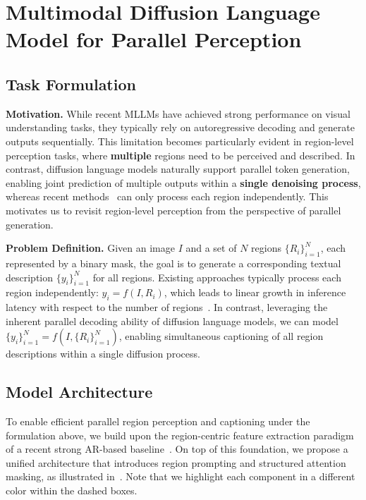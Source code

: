 \vspace{-3mm}
\section{Multimodal Diffusion Language Model for Parallel Perception}

\vspace{-2mm}
\subsection{Task Formulation}
\noindent
\textbf{Motivation.}
While recent MLLMs have achieved strong performance on visual understanding tasks, they typically rely on autoregressive decoding and generate outputs sequentially. 
%
This limitation becomes particularly evident in region-level perception tasks, where \textbf{multiple} regions need to be perceived and described.
%
In contrast, diffusion language models naturally support parallel token generation, enabling joint prediction of multiple outputs within a \textbf{single denoising process}, whereas recent methods~\citep{lian2025describe, wang2025grasp} can only process each region independently. 
%
This motivates us to revisit region-level perception from the perspective of parallel generation.

\noindent
\textbf{Problem Definition.}
Given an image $I$ and a set of $N$ regions $\{ R_i \}_{i=1}^N$, each represented by a binary mask, the goal is to generate a corresponding textual description $\{ y_i \}_{i=1}^N$ for all regions. 
%
Existing approaches typically process each region independently: $y_i = f(I,R_i)$, which leads to linear growth in inference latency with respect to the number of regions~\citep{rasheed2024glamm,lian2025describe}. 
%
In contrast, leveraging the inherent parallel decoding ability of diffusion language models, we can model $\{ y_i \}_{i=1}^N = f(I, \{ R_i \}_{i=1}^N)$, enabling simultaneous captioning of all region descriptions within a single diffusion process.

%
\vspace{-2mm}
\subsection{Model Architecture}
To enable efficient parallel region perception and captioning under the formulation above, we build upon the region-centric feature extraction paradigm of a recent strong AR-based baseline~\citep{wang2025grasp}. On top of this foundation, we propose a unified architecture that introduces region prompting and structured attention masking, as illustrated in~.
Note that we highlight each component in a different color within the dashed boxes.

